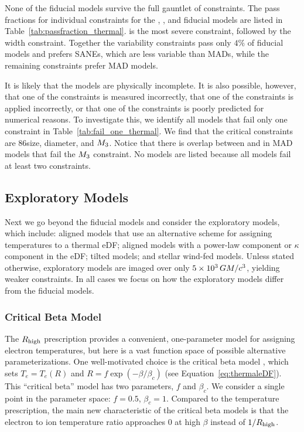 None of the fiducial models  survive the full gauntlet of constraints. The pass fractions for individual constraints for the \bhac, \kharma, and \hamr fiducial models are listed in Table~\ref{tab:passfraction_thermal}.
 is the most severe constraint, followed by the \mring width constraint.
Together the variability constraints pass only $4\%$ of fiducial models and prefers SANEs, which are less variable than MADs, while the remaining constraints prefer MAD models.

It is likely that the models are physically incomplete.
It is also possible, however, that one of the constraints is measured incorrectly, that one of the constraints is applied incorrectly, or that one of the constraints is poorly predicted for numerical reasons.
To investigate this, we identify all models that fail only one constraint in Table~\ref{tab:fail_one_thermal}.
We find that the critical constraints are 86\GHz size, \mring diameter, and $M_{3}$.
Notice that there is overlap between \kharma and \bhac in MAD models that fail the $M_{3}$ constraint.
No \hamr models are listed because all \hamr models fail at least two constraints.

\subsection{Exploratory Models}\label{sec:explore}

Next we go beyond the fiducial models and consider the exploratory models, which include: aligned models that use an alternative scheme for assigning temperatures to a thermal eDF; aligned models with a power-law component or $\kappa$ component in the eDF; tilted models; and stellar wind-fed models.
Unless stated otherwise, exploratory models are imaged over only $5 \times 10^3\,GM/c^3$, yielding weaker constraints.  In all cases we focus on how the exploratory models differ from the fiducial models.

\subsubsection{Critical Beta Model}

The $R_\mathrm{high}$ prescription provides a convenient, one-parameter model for assigning electron temperatures, but here is a vast function space of possible alternative parameterizations.
One well-motivated choice is the critical beta model \citep{2020MNRAS.493.1404A}, which sets $T_e = T_e(R)$ and $R = f \exp(-\beta/\beta_c)$ (see Equation~\ref{eq:thermaleDF}).
This ``critical beta'' model has two parameters, $f$ and $\beta_c$.
We consider a single point in the parameter space: $f = 0.5$, $\beta_c = 1$.
Compared to the \Rh temperature prescription, the main new characteristic of the critical beta models is that the electron to ion temperature ratio approaches 0 at high $\beta$ instead of $1/R_\mathrm{high}$.

